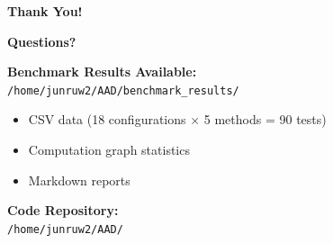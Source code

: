 \documentclass[aspectratio=169]{beamer}
\begin{document}
\begin{frame}
\centering
\Huge \textbf{Thank You!}

\vspace{2em}
\Large \textbf{Questions?}

\vspace{2em}
\normalsize
\textbf{Benchmark Results Available:}\\
\texttt{/home/junruw2/AAD/benchmark\_results/}
\begin{itemize}
    \item CSV data (18 configurations $\times$ 5 methods = 90 tests)
    \item Computation graph statistics
    \item Markdown reports
\end{itemize}

\vspace{1em}
\textbf{Code Repository:}\\
\texttt{/home/junruw2/AAD/}
\end{frame}
\end{document}

